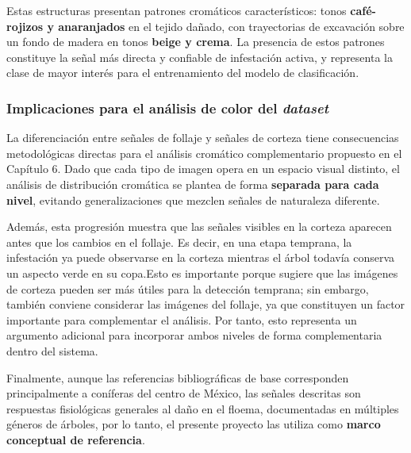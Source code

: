 Estas estructuras presentan patrones cromáticos característicos: tonos \textbf{café-rojizos y anaranjados} en el tejido dañado, con trayectorias de excavación sobre un fondo de madera en tonos \textbf{beige y crema}. La presencia de estos patrones constituye la señal más directa y confiable de infestación activa, y representa la clase de mayor interés para el entrenamiento del modelo de clasificación.

\subsubsection{Implicaciones para el análisis de color del \textit{dataset}}

La diferenciación entre señales de follaje y señales de corteza tiene consecuencias metodológicas directas para el análisis cromático complementario propuesto en el Capítulo 6. Dado que cada tipo de imagen opera en un espacio visual distinto, el análisis de distribución cromática se plantea de forma \textbf{separada para cada nivel}, evitando generalizaciones que mezclen señales de naturaleza diferente.

Además, esta progresión muestra que las señales visibles en la corteza aparecen antes que los cambios en el follaje. Es decir, en una etapa temprana, la infestación ya puede observarse en la corteza mientras el árbol todavía conserva un aspecto verde en su copa.Esto es importante porque sugiere que las imágenes de corteza pueden ser más útiles para la detección temprana; sin embargo, también conviene considerar las imágenes del follaje, ya que constituyen un factor importante para complementar el análisis. Por tanto, esto representa un argumento adicional para incorporar ambos niveles de forma complementaria dentro del sistema.

Finalmente, aunque las referencias bibliográficas de base corresponden principalmente a coníferas del centro de México, las señales descritas son respuestas fisiológicas generales al daño en el floema, documentadas en múltiples géneros de árboles, por lo tanto, el presente proyecto las utiliza como \textbf{marco conceptual de referencia}.
